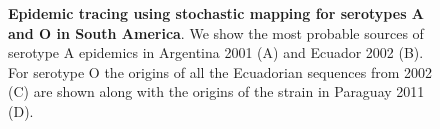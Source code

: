 \documentclass[10pt]{article}
\begin{document}
\begin{figure}[!ht]
\begin{center}
\end{center}
\caption{\textbf{Epidemic tracing using stochastic mapping for serotypes A and O in South America}.
We show the most probable sources of serotype A epidemics in Argentina 2001 (A) and Ecuador 2002 (B).
For serotype O the origins of all the Ecuadorian sequences from 2002 (C) are shown along with the origins of the strain in Paraguay 2011 (D).
}
\label{fig:epidemictracing}
\end{figure}
\end{document}
